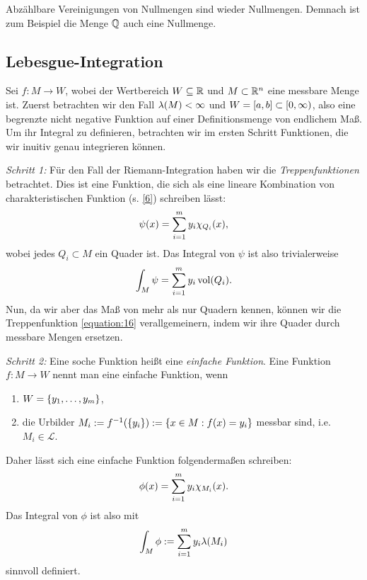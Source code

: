 \begin{remark}\label{remark:5}
	Abzählbare Vereinigungen von Nullmengen sind wieder Nullmengen.
	Demnach ist zum Beispiel die Menge \(\Q\) auch eine Nullmenge.
\end{remark}


\subsection{Lebesgue-Integration}

Sei \(f: M \to W\), wobei der Wertbereich \(W \subseteq \R\) und \(M \subset \R^n\) eine messbare Menge ist.
Zuerst betrachten wir den Fall \(\lambda\parentheses*{M} < \infty\) und \(W = \brackets*{a, b} \subset \left[0, \infty\right)\), also eine begrenzte nicht negative Funktion auf einer Definitionsmenge von endlichem Maß.
Um ihr Integral zu definieren, betrachten wir im ersten Schritt Funktionen, die wir inuitiv genau integrieren können.

\emph{Schritt 1:} Für den Fall der Riemann-Integration haben wir die \emph{Treppenfunktionen} betrachtet.
Dies ist eine Funktion, die sich als eine lineare Kombination von charakteristischen Funktion (s. \eqref{6}) schreiben lässt:
\begin{equation}\label{equation:16}
	\psi\parentheses*{x} = \sum_{i = 1}^m y_i \chi_{Q_i}\parentheses*{x},
\end{equation}
wobei jedes \(Q_i \subset M\) ein Quader ist.
Das Integral von \(\psi\) ist also trivialerweise
\begin{equation}
	\int_M \psi = \sum_{i = 1}^m y_i \vol\parentheses*{Q_i}.
\end{equation}
Nun, da wir aber das Maß von mehr als nur Quadern kennen, können wir die Treppenfunktion \eqref{equation:16} verallgemeinern, indem wir ihre Quader durch messbare Mengen ersetzen.

\emph{Schritt 2:} Eine soche Funktion heißt eine \emph{einfache Funktion}.
Eine Funktion \(f: M \to W\) nennt man eine einfache Funktion, wenn
\begin{enumerate}
	\item \(W = \braces*{y_1, \ldots, y_m}\),
	\item die Urbilder \(M_i := f^{-1}\parentheses*{\braces*{y_i}} := \braces*{x \in M : f\parentheses*{x} = y_i}\) messbar sind, i.e. \(M_i \in \mathcal{L}\).
\end{enumerate}
Daher lässt sich eine einfache Funktion folgendermaßen schreiben:
\begin{equation}
	\phi\parentheses*{x} = \sum_{i = 1}^m y_i \chi_{M_i}\parentheses*{x}.
\end{equation}
Das Integral von \(\phi\) ist also mit
\begin{equation}\label{equation:19}
	\int_M \phi := \sum_{i = 1}^m y_i \lambda\parentheses*{M_i}
\end{equation}
sinnvoll definiert.

